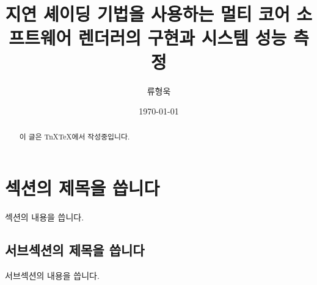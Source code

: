 \documentclass[a4paper,itemph,amsmath]{xoblivoir}
\begin{document}
\title{지연 셰이딩 기법을 사용하는 멀티 코어 소프트웨어 렌더러의 구현과 시스템 성능 측정}
\author{류형욱}
\date{\today}

\maketitle

\begin{abstract}
 이 글은 TnX\TeX 에서 작성중입니다.
\end{abstract}

\section{섹션의 제목을 씁니다}

섹션의 내용을 씁니다.

\subsection{서브섹션의 제목을 씁니다}
서브섹션의 내용을 씁니다.

\end{document}
